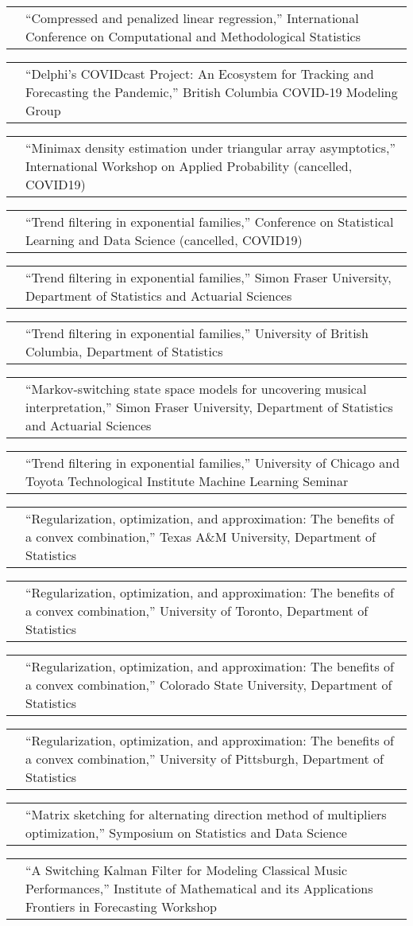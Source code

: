 \documentclass[11pt,letterpaper]{minimal/moderncv}
\makeatletter
\renewcommand*{\cvitem}[2]{%
  \begin{tabular}{@{}p{\hintscolumnwidth}@{\hspace{\separatorcolumnwidth}}%
    p{\maincolumnwidth}@{}}%
    \raggedleft {#1} &  {#2}%
  \end{tabular}%
}
\makeatother
\begin{document}
\cvitem{2020}{``Compressed and penalized linear regression,''
  International Conference on Computational and Methodological Statistics}

\cvitem{}{``Delphi's COVIDcast Project: 
  An Ecosystem for Tracking and Forecasting the Pandemic,'' British Columbia
  COVID-19 Modeling Group}

\cvitem{}{``Minimax density estimation under triangular array asymptotics,''
  International Workshop on Applied Probability (cancelled, COVID19)} 

\cvitem{}{``Trend filtering in exponential families,'' Conference
    on Statistical Learning and Data Science (cancelled, COVID19)}

\cvitem{}{``Trend filtering in exponential families,'' Simon
  Fraser University, Department of Statistics and Actuarial Sciences}


\cvitem{}{``Trend filtering in exponential families,'' University
  of British Columbia, Department of Statistics}

\cvitem{2019}{``Markov-switching state space models for uncovering
  musical interpretation,'' Simon Fraser University, Department of
  Statistics and Actuarial Sciences}

\cvitem{}{ ``Trend filtering in exponential families,'' University of
  Chicago and Toyota Technological Institute Machine Learning
  Seminar}

\cvitem{}{ ``Regularization, optimization, and approximation: The benefits
  of a convex combination,'' Texas A\&M University, Department of
  Statistics }

\cvitem{}{ ``Regularization, optimization, and approximation: The benefits
  of a convex combination,'' University of Toronto, Department of
  Statistics }

\cvitem{}{ ``Regularization, optimization, and approximation: The benefits
  of a convex combination,'' Colorado State University, Department of
  Statistics }

\cvitem{}{ ``Regularization, optimization, and approximation: The benefits
  of a convex combination,'' University of Pittsburgh, Department of
  Statistics }

\cvitem{2018}{ ``Matrix sketching for alternating direction method of
  multipliers optimization,'' Symposium on Statistics and Data
  Science}

\cvitem{}{``A Switching Kalman Filter for Modeling Classical Music
  Performances,'' Institute of Mathematical and its Applications
  Frontiers in Forecasting Workshop}
\end{document}
